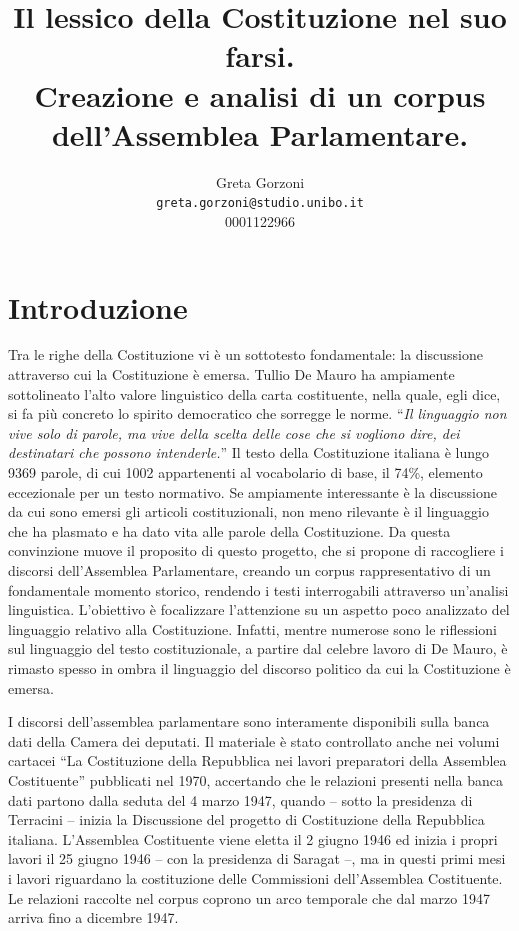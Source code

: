 \documentclass{article}
\title{\textbf{Il lessico della Costituzione nel suo farsi. \\
Creazione e analisi di un corpus dell'Assemblea Parlamentare.}}
\author{Greta Gorzoni\\
\texttt{greta.gorzoni@studio.unibo.it}\\
0001122966}
\date{}
\begin{document}
\maketitle

\section{Introduzione}

Tra le righe della Costituzione vi è un sottotesto fondamentale: la discussione attraverso cui la Costituzione è emersa. Tullio De Mauro ha ampiamente sottolineato l’alto valore linguistico della carta costituente, nella quale, egli dice, si fa più concreto lo spirito democratico che sorregge le norme. “\textit{Il linguaggio non vive solo di parole, ma vive della scelta delle cose che si vogliono dire, dei destinatari che possono intenderle.}” Il testo della Costituzione italiana è lungo 9369 parole, di cui 1002 appartenenti al vocabolario di base, il 74\%, elemento eccezionale per un testo normativo. Se ampiamente interessante è la discussione da cui sono emersi gli articoli costituzionali, non meno rilevante è il linguaggio che ha plasmato e ha dato vita alle parole della Costituzione. Da questa convinzione muove il proposito di questo progetto, che si propone di raccogliere i discorsi dell’Assemblea Parlamentare, creando un corpus rappresentativo di un fondamentale momento storico, rendendo i testi interrogabili attraverso un’analisi linguistica. L’obiettivo è focalizzare l’attenzione su un aspetto poco analizzato del linguaggio relativo alla Costituzione. Infatti, mentre numerose sono le riflessioni sul linguaggio del testo costituzionale, a partire dal celebre lavoro di De Mauro, è rimasto spesso in ombra il linguaggio del discorso politico da cui la Costituzione è emersa.

I discorsi dell’assemblea parlamentare sono interamente disponibili sulla banca dati della Camera dei deputati. Il materiale è stato controllato anche nei volumi cartacei “La Costituzione della Repubblica nei lavori preparatori della Assemblea Costituente” pubblicati nel 1970, accertando che le relazioni presenti nella banca dati partono dalla seduta del 4 marzo 1947, quando – sotto la presidenza di Terracini – inizia la Discussione del progetto di Costituzione della Repubblica italiana. L’Assemblea Costituente viene eletta il 2 giugno 1946 ed inizia i propri lavori il 25 giugno 1946 – con la presidenza di Saragat –, ma in questi primi mesi i lavori riguardano la costituzione delle Commissioni dell’Assemblea Costituente. Le relazioni raccolte nel corpus coprono un arco temporale che dal marzo 1947 arriva fino a dicembre 1947. 
\end{document}
